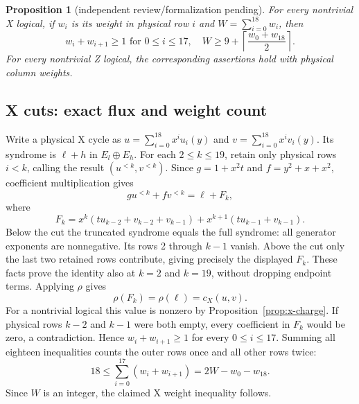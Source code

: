 \documentclass{article}
\newtheorem{proposition}{Proposition}
\begin{document}
\begin{proposition}[independent review\slash formalization pending]\label{prop:transport}
  For every nontrivial X logical, if \(w_i\) is its weight in physical row \(i\) and
  \(W = \sum_{i=0}^{18} w_i\), then
  \begin{equation}
    w_i + w_{i+1} \ge 1 \text{ for } 0 \le i \le 17,
    \quad W \ge 9 + \left\lceil \frac{w_0 + w_{18}}{2} \right\rceil.
  \end{equation}
  For every nontrivial Z logical, the corresponding assertions hold with physical column
  weights.
\end{proposition}

\subsection{X cuts: exact flux and weight count}\label{sec:x-cuts}

Write a physical X cycle as \(u = \sum_{i=0}^{18} x^i u_i(y)\) and
\(v = \sum_{i=0}^{18} x^i v_i(y)\). Its syndrome is \(\ell + h\) in \(E_l \oplus E_h\). For
each \(2 \le k \le 19\), retain only physical rows \(i < k\), calling the result
\((u^{<k}, v^{<k})\). Since \(g = 1 + x^2 t\) and \(f = y^2 + x + x^2\), coefficient
multiplication gives
\begin{equation}
  g u^{<k} + f v^{<k} = \ell + F_k,
\end{equation}
where
\begin{equation}
  F_k = x^k (t u_{k-2} + v_{k-2} + v_{k-1})
  + x^{k+1} (t u_{k-1} + v_{k-1}).
\end{equation}
Below the cut the truncated syndrome equals the full syndrome: all generator exponents are
nonnegative. Its rows 2 through \(k - 1\) vanish. Above the cut only the last two retained
rows contribute, giving precisely the displayed \(F_k\). These facts prove the identity also
at \(k = 2\) and \(k = 19\), without dropping endpoint terms. Applying \(\rho\) gives
\begin{equation}
  \rho(F_k) = \rho(\ell) = c_X(u, v).
\end{equation}
For a nontrivial logical this value is nonzero by Proposition~\ref{prop:x-charge}. If physical
rows \(k - 2\) and \(k - 1\) were both empty, every coefficient in \(F_k\) would be zero, a
contradiction. Hence \(w_i + w_{i+1} \ge 1\) for every \(0 \le i \le 17\). Summing all
eighteen inequalities counts the outer rows once and all other rows twice:
\begin{equation}
  18 \le \sum_{i=0}^{17} (w_i + w_{i+1}) = 2W - w_0 - w_{18}.
\end{equation}
Since \(W\) is an integer, the claimed X weight inequality follows.
\end{document}
